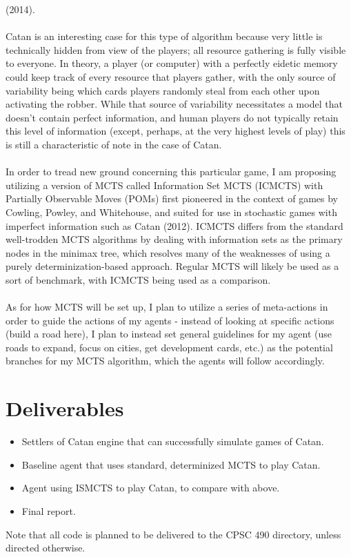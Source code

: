 \documentclass[a4paper, 11pt]{article}
\begin{document}
(2014).
\\ \\ 
\noindent Catan is an interesting case for this type of algorithm because very little is technically hidden from view of the players; all resource gathering is fully visible to everyone. In theory, a player (or computer) with a perfectly eidetic memory could keep track of every resource that players gather, with the only source of variability being which cards players randomly steal from each other upon activating the robber. While that source of variability necessitates a model that doesn't contain perfect information, and human players do not typically retain this level of information (except, perhaps, at the very highest levels of play) this is still a characteristic of note in the case of Catan.
\\ \\
\noindent In order to tread new ground concerning this particular game, I am proposing utilizing a version of MCTS called Information Set MCTS (ICMCTS) with Partially Observable Moves (POMs) first pioneered in the context of games by Cowling, Powley, and Whitehouse, and suited for use in stochastic games with imperfect information such as Catan (2012). ICMCTS differs from the standard well-trodden MCTS algorithms by dealing with information sets as the primary nodes in the minimax tree, which resolves many of the weaknesses of using a purely determinization-based approach. Regular MCTS will likely be used as a sort of benchmark, with ICMCTS being used as a comparison. 
\\ \\
\noindent As for how MCTS will be set up, I plan to utilize a series of meta-actions in order to guide the actions of my agents - instead of looking at specific actions (build a road here), I plan to instead set general guidelines for my agent (use roads to expand, focus on cities, get development cards, etc.) as the potential branches for my MCTS algorithm, which the agents will follow accordingly.

\section{Deliverables}

\begin{itemize}
	\item Settlers of Catan engine that can successfully simulate games of Catan.
	\item Baseline agent that uses standard, determinized MCTS to play Catan.
	\item Agent using ISMCTS to play Catan, to compare with above.
	\item Final report.
\end{itemize}
Note that all code is planned to be delivered to the CPSC 490 directory, unless directed otherwise.
\end{document}
